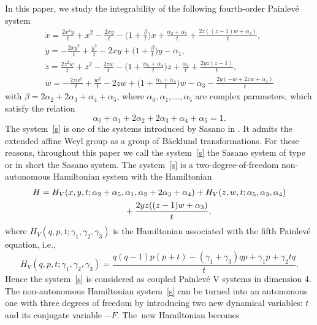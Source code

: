 \documentclass[pdftex]{sigma}
\numberwithin{equation}{section}
\begin{document}
 In this paper, we study the integrability of the following fourth-order Painlev\'{e} system
 \begin{gather}
 \dot{x} =
 \frac{2 x^2 y}{t} + x^2 - \frac{2 x y}{t}
 -\biggl(1 + \frac{\beta}{t}\biggr) x
 +\frac{\alpha_2+\alpha_5}{t} + \frac{2 z ((z-1) w + \alpha_3)}{t},\nonumber\\
 \dot{y} =
 -\frac{2 x y^2}{t} + \frac{y^2}{t} - 2 x y
 +\biggl(1 + \frac{\beta}{t}\biggr) y -\alpha_1,\nonumber\\
 \dot{z} =
 \frac{2 z^2 w}{t} + z^2 - \frac{2 z w}{t}
 -\biggl(1 + \frac{\alpha_5+\alpha_4}{t}\biggr) z
 +\frac{\alpha_5}{t} + \frac{2 y z (z-1)}{t},\nonumber\\
 \dot{w} =
 -\frac{2 z w^2}{t} + \frac{w^2}{t} - 2 z w
 +\biggl(1 + \frac{\alpha_5+\alpha_4}{t}\biggr) w - \alpha_3 -
 \frac{2 y (-w + 2 z w + \alpha_3)}{t}\label{s}
 \end{gather}
 with $\beta=2 \alpha_2+2 \alpha_3 + \alpha_4+\alpha_5$, where $\alpha_0, \alpha_1, \dots, \alpha_5$
 are complex parameters, which satisfy the relation
 \begin{equation*}
 \alpha_0+\alpha_1 + 2 \alpha_2 + 2 \alpha_3 + \alpha_4 + \alpha_5=1 .%
 \end{equation*}
 The system~\eqref{s} is one of the systems introduced by Sasano in \cite{Sa}. It admits the extended affine Weyl
 group  as a group of B\"{a}cklund transformations. For these reasons, throughout this
 paper we call the system~\eqref{s} the Sasano system of type  or in short the Sasano system.
 The system~\eqref{s} is a two-degree-of-freedom non-autonomous Hamiltonian system with the Hamiltonian
 \begin{gather}
 H = H_{V} (x, y, t; \alpha_2+\alpha_5, \alpha_1, \alpha_2 + 2 \alpha_3 +\alpha_4) +
 H_{V} (z, w, t; \alpha_5, \alpha_3, \alpha_4) \nonumber\\
 \hphantom{H =}{} +
 \frac{2 y z ((z-1) w + \alpha_3)}{t} ,\label{H51}
 \end{gather}
 where $H_{V}(q, p, t; \gamma_1, \gamma_2, \gamma_3)$ is the Hamiltonian associated with the fifth Painlev\'{e} equation,
 i.e.,
 \[
 H_{V}(q, p, t ; \gamma_1, \gamma_2, \gamma_3)=
 \frac{q (q-1) p (p+t) - (\gamma_1+\gamma_3) q p + \gamma_1 p + \gamma_2 t q}{t} .
 \]
 Hence the system~\eqref{s} is considered as coupled Painlev\'{e} V systems in dimension 4. The
 non-autonomous Hamiltonian system~\eqref{s} can be turned into an autonomous one with three degrees of freedom
 by introducing two new dynamical variables: $t$ and its conjugate variable $-F$. The~new Hamiltonian becomes
\end{document}

